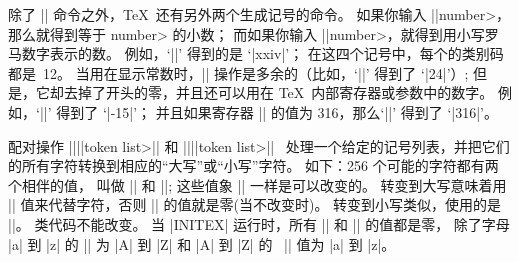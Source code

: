 {{{{{%
\ddanger 除了 |\string| 命令之外，\TeX\ 还有另外两个生成记号的命令。
如果你输入 |\number|\<number>，那么就得到等于 \<number> 的小数；
而如果你输入 |\romannumeral|\<number>，就得到用小写罗马数字表示的数。
\1例如，`||' 得到的是 `|xxiv|'；
在这四个记号中，每个的类别码都是~12。
当用在显示常数时，|\number| 操作是多余的（比如，`||' 得到了 `|24|'）;
但是，它却去掉了开头的零，并且还可以用在 \TeX\ 内部寄存器或参数中的数字。%
例如，`||' 得到了 `|-15|'；
并且如果寄存器 || 的值为 316，那么`|\number{}|' 得到了 `|316|'。

\ddanger 配对操作 |\uppercase||{|\<token list>|}| 和 |\lowercase||{|\<token list>|}|~%
处理一个给定的记号列表，并把它们的所有字符转换到相应的``大写''或``小写''字符。%
如下：256 个可能的字符都有两个相伴的\hbox{值，} 叫做 |\uccode| 和 |\lccode|;
这些值象 |\catcode| 一样是可以改变的。
转变到大写意味着用 |\uccode| 值来代替字符，否则 |\uccode| 的值就是零(当不改变时)。%
转变到小写类似，使用的是 |\lccode|。%
类代码不能改\hbox{变。}%
当 |INITEX| 运行时，所有 |\uccode| 和 |\lccode| 的值都是零，
除了字母 |a| 到 |z| 的 |\uccode| 为 |A| 到 |Z| 和 |A| 到 |Z| 的%
~|\lccode| 值为 |a| 到 |z|。

}}}}}
